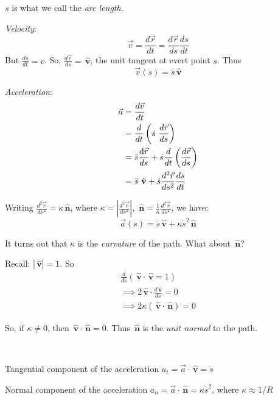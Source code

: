 \documentclass[twoside]{scrartcl}
\let\oldhat\hat
\renewcommand{\hat}[1]{\,\oldhat{\boldsymbol{\mathbf{#1}}}}
\begin{document}
\begin{definition} $s$ is what we call the \emph{arc length}. 

\emph{Velocity}:
\[\vec{v} = \frac{d\vec{r}}{dt} = \frac{d\vec{r}}{ds}\frac{ds}{dt}\]
But $\displaystyle{\frac{ds}{dt} = v}$. So, $\displaystyle{\frac{d\vec{r}}{ds} = \hat{v}}$, the unit tangent at evert point $s$. Thus
\[\boxed{\vec{v}(s) = \dot{s}\hat{v}}\]

\emph{Acceleration}: \[\begin{aligned}
	\vec{a} &= \frac{d\vec{v}}{dt}\\ &= \frac{d}{dt}\left(\dot{s}~ \frac{d\vec{r}}{ds}\right)\\
	&= \ddot{s}\frac{\d\vec{r}}{ds} + \dot{s}\frac{d}{dt}\left(\frac{d\vec{r}}{ds}\right)\\
	 &= \ddot{s}\hat{v} + \dot{s}\frac{d^2\vec{r}}{ds^2}\frac{ds}{dt}\end{aligned}
\]

Writing $\displaystyle{\frac{d^2\vec{r}}{ds^2} = \kappa \hat{n}}$, where $\displaystyle{\kappa =\left|\frac{d^2\vec{r}}{ds^2}\right| }$, $\hat{n} = \displaystyle{\frac{1}{\kappa}\frac{d^2\vec{r}}{ds^2}}$, we have: 
\[\boxed{\vec{a}(s) = \ddot{s}\hat{v} + \kappa \dot{s}^2\hat{n}}\]

It turns out that $\kappa$ is the \emph{curvature} of the path. What about $\hat{n}$?

Recall: $|\hat{v}| = 1$. So 
\[\begin{aligned}\frac{d}{ds}(\hat{v}\cdot\hat{v} = 1)\\
 \implies 2\hat{v}\cdot\frac{d\hat{v}}{ds} = 0\\
 \implies 2\kappa(\hat{v}\cdot\hat{n}) = 0	
\end{aligned}
\]

So, if $\kappa \neq 0$, then $\hat{v}\cdot \hat{n} = 0$. Thus $\hat{n}$ is the \emph{unit normal} to the path.
\end{definition}~


Tangential component of the acceleration $a_t = \vec{a}\cdot\hat{v} = \ddot{s}$

Normal component of the acceleration $a_n = \vec{a}\cdot\hat{n} = \kappa \dot{s}^2$, where $\kappa \approx 1/R$

\begin{center}
\end{center}
\end{document}
